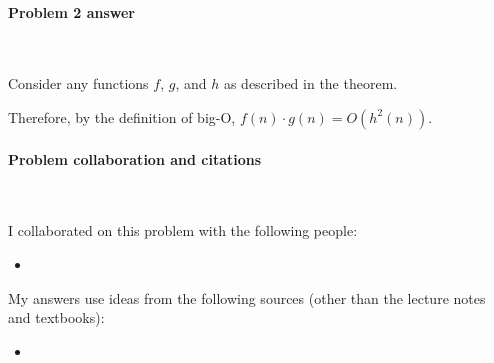 

\paragraph{Problem 2 answer}~

\begin{longFormProof}

  \step Consider any functions $f$, $g$, and $h$ as described in the theorem.

  \begin{blue}
    
    \step \REPLACEME
    
    \step \REPLACEME


  \end{blue}
  
  \step Therefore, by the definition of big-O, $f(n) \cdot g(n) = O(h^2(n))$. 
  
\end{longFormProof}

\vfill


\paragraph{Problem  collaboration and citations}~

I collaborated on this problem with the following people:
\begin{blue}
  \begin{itemize}
  \item \REPLACEME                    %
  \end{itemize}
\end{blue}

My answers use ideas from the following sources (other than the lecture notes and textbooks): 
\begin{blue}
  \begin{itemize}
  \item \REPLACEME                    %
  \end{itemize}
\end{blue}

